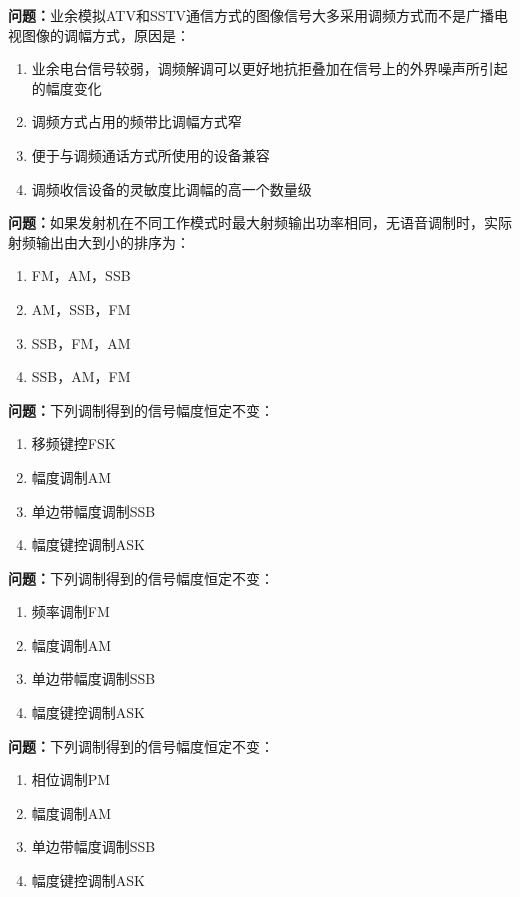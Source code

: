 \bigskip


\noindent\textbf{问题：}业余模拟ATV和SSTV通信方式的图像信号大多采用调频方式而不是广播电视图像的调幅方式，原因是：
\begin{enumerate}[label=\Alph*), leftmargin=3em]
\item 业余电台信号较弱，调频解调可以更好地抗拒叠加在信号上的外界噪声所引起的幅度变化
\item 调频方式占用的频带比调幅方式窄
\item 便于与调频通话方式所使用的设备兼容
\item 调频收信设备的灵敏度比调幅的高一个数量级
\end{enumerate}

\bigskip


\noindent\textbf{问题：}如果发射机在不同工作模式时最大射频输出功率相同，无语音调制时，实际射频输出由大到小的排序为：
\begin{enumerate}[label=\Alph*), leftmargin=3em]
\item FM，AM，SSB
\item AM，SSB，FM
\item SSB，FM，AM
\item SSB，AM，FM
\end{enumerate}

\bigskip


\noindent\textbf{问题：}下列调制得到的信号幅度恒定不变：
\begin{enumerate}[label=\Alph*), leftmargin=3em]
\item 移频键控FSK
\item 幅度调制AM
\item 单边带幅度调制SSB
\item 幅度键控调制ASK
\end{enumerate}

\bigskip


\noindent\textbf{问题：}下列调制得到的信号幅度恒定不变：
\begin{enumerate}[label=\Alph*), leftmargin=3em]
\item 频率调制FM
\item 幅度调制AM
\item 单边带幅度调制SSB
\item 幅度键控调制ASK
\end{enumerate}

\bigskip


\noindent\textbf{问题：}下列调制得到的信号幅度恒定不变：
\begin{enumerate}[label=\Alph*), leftmargin=3em]
\item 相位调制PM
\item 幅度调制AM
\item 单边带幅度调制SSB
\item 幅度键控调制ASK
\end{enumerate}


